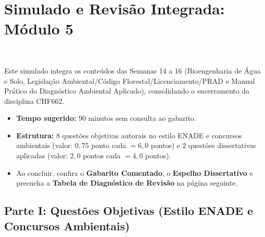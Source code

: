\clearpage
{}
{}
\chapter*{Simulado e Revisão Integrada: Módulo 5}

\noindent\tagPratica\ \tagEmenta
\vspace{6pt}

\begin{boxConceito}
Este simulado integra os conteúdos das Semanas 14 a 16 (Bioengenharia de Água e Solo, Legislação Ambiental/Código Florestal/Licenciamento/PRAD e Manual Prático do Diagnóstico Ambiental Aplicado), consolidando o encerramento da disciplina CHF662.
\begin{itemize}[leftmargin=1.5em, itemsep=2pt]
  \item \textbf{Tempo sugerido:} $90$ minutos sem consulta ao gabarito.
  \item \textbf{Estrutura:} $8$ questões objetivas autorais no estilo ENADE e concursos ambientais (valor: $0{,}75$ ponto cada $= 6{,}0$ pontos) e $2$ questões dissertativas aplicadas (valor: $2{,}0$ pontos cada $= 4{,}0$ pontos).
  \item Ao concluir, confira o \textbf{Gabarito Comentado}, o \textbf{Espelho Dissertativo} e preencha a \textbf{Tabela de Diagnóstico de Revisão} na página seguinte.
\end{itemize}
\end{boxConceito}

\section*{Parte I: Questões Objetivas (Estilo ENADE e Concursos Ambientais)}

